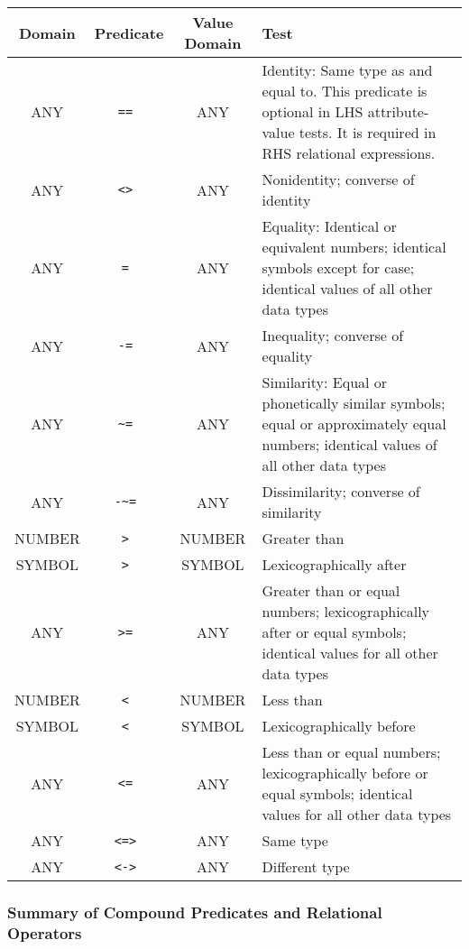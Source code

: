 \begin{tabularx}{\columnwidth}{cccX}
  \toprule
  Domain & Predicate & Value Domain & Test \\
  \midrule
  ANY & \tt{==} & ANY & Identity: Same type as and equal to.
                        This predicate is optional in
                        LHS attribute-value tests. It is required
                        in RHS relational expressions. \\
  ANY & \tt{<>} & ANY & Nonidentity; converse of identity \\
  ANY & \tt{=}  & ANY & Equality: Identical or equivalent numbers;
                        identical symbols except for case;
                        identical values of all other 
                        data types                      \\
  ANY & \tt{-=} & ANY & Inequality; converse of   
                        equality \\
  ANY & \tt{\textasciitilde=} & ANY & Similarity: Equal or phonetically
                                      similar symbols; equal or
                                      approximately equal  numbers; 
                                      identical values of all other
                                      data types \\
  ANY & \tt{-\textasciitilde=} & ANY & Dissimilarity; converse of similarity \\
  NUMBER & \tt{>} & NUMBER & Greater than \\
  SYMBOL & \tt{>} & SYMBOL & Lexicographically after \\
  ANY    & \tt{>=} & ANY & Greater than or equal numbers;
                           lexicographically after or  equal symbols;
                           identical values for all other data types \\
  NUMBER & \tt{<} & NUMBER & Less than \\
  SYMBOL & \tt{<} & SYMBOL & Lexicographically before \\
  ANY    & \tt{<=} & ANY & Less than or equal numbers;
                           lexicographically before or equal symbols;
                           identical values  for all other data types \\
  ANY & \tt{<=>} & ANY & Same type \\
  ANY & \tt{<->} & ANY & Different type \\
  \bottomrule
\end{tabularx}

\subsubsection{Summary of Compound Predicates and Relational Operators}

